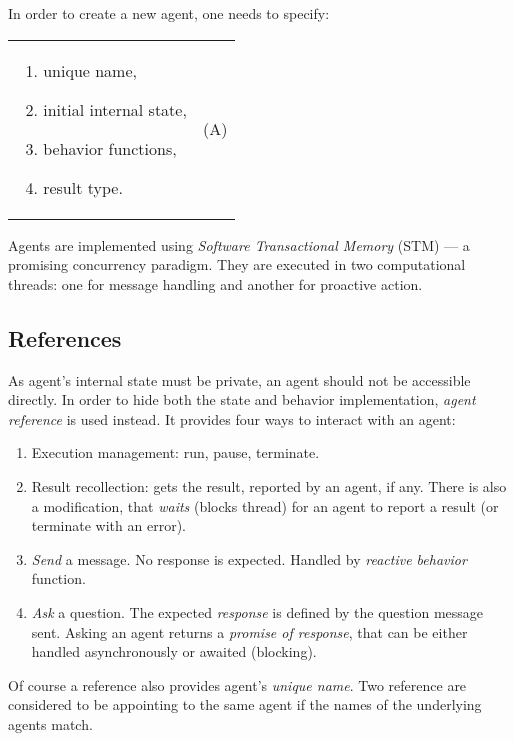 \documentclass[../header]{subfiles}
\begin{document}
\medskip

\noindent
In order to create a new agent, one needs to specify: \\
\begin{tabularx}{\textwidth}{X c}
  \multicolumn{1}{m{0.4\textwidth}}{
    \begin{enumerate}
      \item unique name,
      \item initial internal state,
      \item behavior functions,
      \item result type.
    \end{enumerate}
  }
&  (A)
\end{tabularx}

\bigskip

\noindent
Agents are implemented using \emph{Software Transactional Memory} (STM)
\cite{STMCode07} --- a promising concurrency paradigm.
They are executed in two computational threads:
one for message handling and another for proactive action.

\subsection{References}
As agent's internal state must be private, an agent should not be accessible directly.
In order to hide both the state and behavior implementation, \emph{agent reference}
is used instead. It provides four ways to interact with an agent:
\begin{enumerate}
  \item Execution management: run, pause, terminate.
  \item Result recollection: gets the result, reported by an agent, if any.
        There is also a modification, that \emph{waits} (blocks thread) for an agent
        to report a result (or terminate with an error).
  \item \emph{Send} a message. No response is expected. Handled by
        \emph{reactive behavior} function.
  \item \emph{Ask} a question. The expected \emph{response} is defined by
        the question message sent. Asking an agent returns a \emph{promise of response},
        that can be either handled asynchronously or awaited (blocking).
\end{enumerate}

Of course a reference also provides agent's \emph{unique name}. Two
reference are considered to be appointing to the same agent if the names
of the underlying agents match.
\end{document}
